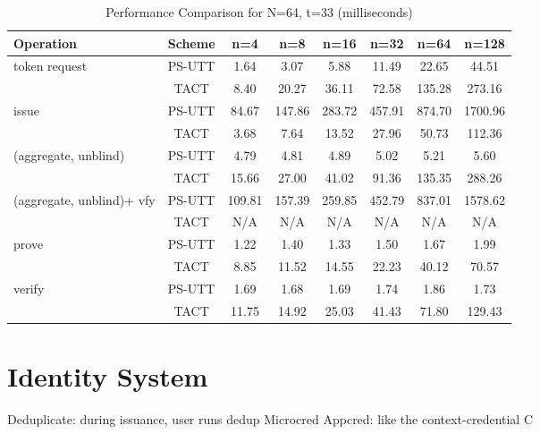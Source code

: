 \begin{table}[htbp]
\centering
\caption{Performance Comparison for N=64, t=33 (milliseconds)}
\begin{tabular}{lccccccc}
\toprule
\textbf{Operation} & \textbf{Scheme} & \textbf{n=4} & \textbf{n=8} & \textbf{n=16} & \textbf{n=32} & \textbf{n=64} & \textbf{n=128} \\
\midrule
token request & PS-UTT & 1.64 & 3.07 & 5.88 & 11.49 & 22.65 & 44.51 \\
 & TACT & 8.40 & 20.27 & 36.11 & 72.58 & 135.28 & 273.16 \\
\midrule
issue & PS-UTT & 84.67 & 147.86 & 283.72 & 457.91 & 874.70 & 1700.96 \\
 & TACT & 3.68 & 7.64 & 13.52 & 27.96 & 50.73 & 112.36 \\
\midrule
(aggregate, unblind) & PS-UTT & 4.79 & 4.81 & 4.89 & 5.02 & 5.21 & 5.60 \\
 & TACT & 15.66 & 27.00 & 41.02 & 91.36 & 135.35 & 288.26 \\
\midrule
(aggregate, unblind)+ vfy & PS-UTT & 109.81 & 157.39 & 259.85 & 452.79 & 837.01 & 1578.62 \\
 & TACT & N/A & N/A & N/A & N/A & N/A & N/A \\
\midrule
prove & PS-UTT & 1.22 & 1.40 & 1.33 & 1.50 & 1.67 & 1.99 \\
 & TACT & 8.85 & 11.52 & 14.55 & 22.23 & 40.12 & 70.57 \\
\midrule
verify & PS-UTT & 1.69 & 1.68 & 1.69 & 1.74 & 1.86 & 1.73 \\
 & TACT & 11.75 & 14.92 & 25.03 & 41.43 & 71.80 & 129.43 \\
\bottomrule
\end{tabular}
\label{tab:perf-comp-64-33}
\end{table}




\section{Identity System}
Deduplicate: during issuance, user runs dedup
Microcred
Appcred: like the context-credential C
